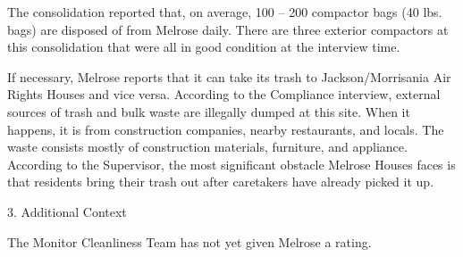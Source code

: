 The consolidation reported that, on average, 100 -- 200 compactor bags (40 lbs. bags) are disposed of from Melrose daily. There are three exterior compactors at this consolidation that were all in good condition at the interview time.

If necessary, Melrose reports that it can take its trash to  Jackson/Morrisania Air Rights Houses and vice versa. According to the Compliance interview, external sources of trash and bulk waste are illegally dumped at this site. When it happens, it is from construction companies, nearby restaurants, and locals. The waste consists mostly of construction materials, furniture, and appliance. According to the  Supervisor, the most significant obstacle Melrose Houses faces is that residents bring their trash out after caretakers have already picked it up.  

3. Additional Context

The Monitor Cleanliness Team has not yet given Melrose a rating.